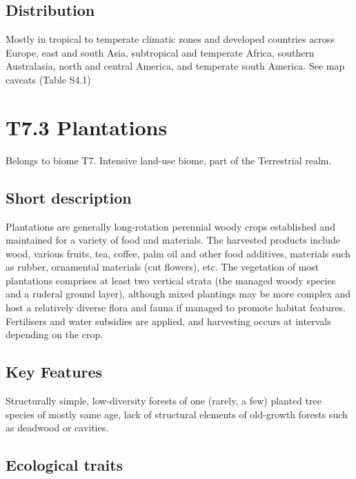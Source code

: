 \documentclass[
  letterpaper,
  DIV=11,
  numbers=noendperiod]{scrartcl}
\begin{document}
\subsection{Distribution}\label{distribution-99}

Mostly in tropical to temperate climatic zones and developed countries
across Europe, east and south Asia, subtropical and temperate Africa,
southern Australasia, north and central America, and temperate south
America. See map caveats (Table S4.1)

\section{T7.3 Plantations}\label{t7.3-plantations}

Belongs to biome T7. Intensive land-use biome, part of the Terrestrial
realm.

\subsection{Short description}\label{short-description-100}

Plantations are generally long-rotation perennial woody crops
established and maintained for a variety of food and materials. The
harvested products include wood, various fruits, tea, coffee, palm oil
and other food additives, materials such as rubber, ornamental materials
(cut flowers), etc. The vegetation of most plantations comprises at
least two vertical strata (the managed woody species and a ruderal
ground layer), although mixed plantings may be more complex and host a
relatively diverse flora and fauna if managed to promote habitat
features. Fertilisers and water subsidies are applied, and harvesting
occurs at intervals depending on the crop.

\subsection{Key Features}\label{key-features-100}

Structurally simple, low-diversity forests of one (rarely, a few)
planted tree species of mostly same age, lack of structural elements of
old-growth forests such as deadwood or cavities.

\subsection{Ecological traits}\label{ecological-traits-100}
\end{document}
